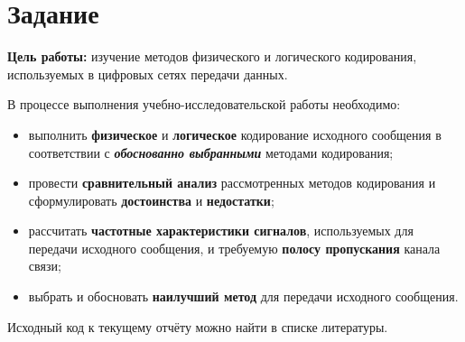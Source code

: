 \section{Задание}

\textbf{Цель работы:} изучение методов физического и логического кодирования, используемых в цифровых сетях передачи данных.

В процессе выполнения учебно-исследовательской работы необходимо:
\begin{itemize}
    \item выполнить \textbf{физическое} и \textbf{логическое} кодирование исходного сообщения в соответствии с \textit{\textbf{обоснованно выбранными}} методами кодирования;
    \item провести \textbf{сравнительный анализ} рассмотренных методов кодирования и сформулировать \textbf{достоинства} и \textbf{недостатки};
    \item рассчитать \textbf{частотные характеристики сигналов}, используемых для передачи исходного сообщения, и требуемую \textbf{полосу пропускания} канала связи;
    \item выбрать и обосновать \textbf{наилучший метод} для передачи исходного сообщения.
\end{itemize}

Исходный код к текущему отчёту можно найти в списке литературы.\cite{mrdvd2026itmo_labs}